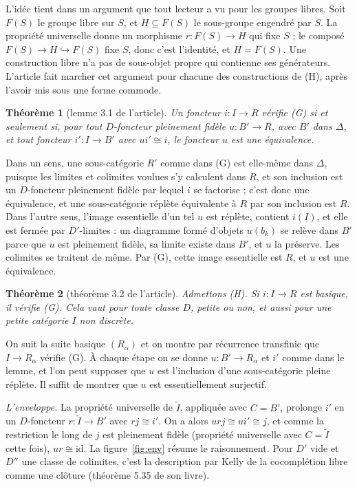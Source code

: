 \documentclass[11pt,a4paper]{amsart}
\theoremstyle{definition}
\theoremstyle{plain}
\newtheorem{theoreme}{Théorème}
\theoremstyle{remark}
\newcommand{\It}{\widetilde I}
\begin{document}
L'idée tient dans un argument que tout lecteur a vu pour les groupes libres. Soit $F(S)$ le groupe libre sur $S$, et $H\subseteq F(S)$ le sous-groupe engendré par $S$. La propriété universelle donne un morphisme $r\colon F(S)\to H$ qui fixe $S$ ; le composé $F(S)\to H\hookrightarrow F(S)$ fixe $S$, donc c'est l'identité, et $H=F(S)$. Une construction libre n'a pas de sous-objet propre qui contienne ses générateurs. L'article fait marcher cet argument pour chacune des constructions de (H), après l'avoir mis sous une forme commode.

\begin{theoreme}[lemme 3.1 de l'article]
Un foncteur $i\colon I\to R$ vérifie (G) si et seulement si, pour tout $D$-foncteur pleinement fidèle $u\colon B'\to R$, avec $B'$ dans $\Delta$, et tout foncteur $i'\colon I\to B'$ avec $ui'\cong i$, le foncteur $u$ est une équivalence.
\end{theoreme}

Dans un sens, une sous-catégorie $R'$ comme dans (G) est elle-même dans $\Delta$, puisque les limites et colimites voulues s'y calculent dans $R$, et son inclusion est un $D$-foncteur pleinement fidèle par lequel $i$ se factorise ; c'est donc une équivalence, et une sous-catégorie réplète équivalente à $R$ par son inclusion est $R$. Dans l'autre sens, l'image essentielle d'un tel $u$ est réplète, contient $i(I)$, et elle est fermée par $D'$-limites : un diagramme formé d'objets $u(b_k)$ se relève dans $B'$ parce que $u$ est pleinement fidèle, sa limite existe dans $B'$, et $u$ la préserve. Les colimites se traitent de même. Par (G), cette image essentielle est $R$, et $u$ est une équivalence.

\begin{theoreme}[théorème 3.2 de l'article]
Admettons (H). Si $i\colon I\to R$ est basique, il vérifie (G). Cela vaut pour toute classe $D$, petite ou non, et aussi pour une petite catégorie $I$ non discrète.
\end{theoreme}

On suit la suite basique $(R_\alpha)$ et on montre par récurrence transfinie que $I\to R_\alpha$ vérifie (G). À chaque étape on se donne $u\colon B'\to R_\alpha$ et $i'$ comme dans le lemme, et l'on peut supposer que $u$ est l'inclusion d'une sous-catégorie pleine réplète. Il suffit de montrer que $u$ est essentiellement surjectif.

\emph{L'enveloppe.} La propriété universelle de $\It$, appliquée avec $C=B'$, prolonge $i'$ en un $D$-foncteur $r\colon\It\to B'$ avec $rj\cong i'$. On a alors $urj\cong ui'\cong j$, et comme la restriction le long de $j$ est pleinement fidèle (propriété universelle avec $C=\It$ cette fois), $ur\cong\mathrm{id}$. La figure~\ref{fig:env} résume le raisonnement. Pour $D'$ vide et $D''$ une classe de colimites, c'est la description par Kelly de la cocomplétion libre comme une clôture (théorème 5.35 de son livre).
\end{document}
